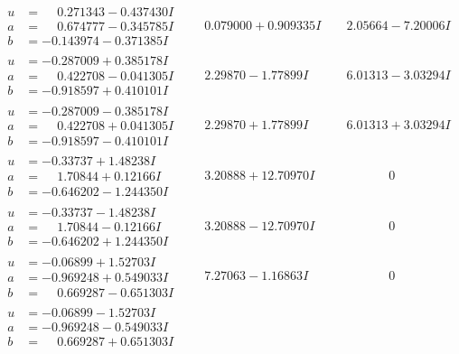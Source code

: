 \documentclass[1p]{elsarticle_modified}
\theoremstyle{definition}
\begin{document}
$$\begin{array}{c|c|c}
\begin{aligned}
u &= \phantom{-}0.271343 - 0.437430 I \\
a &= \phantom{-}0.674777 - 0.345785 I \\
b &= -0.143974 - 0.371385 I\end{aligned}
 & \phantom{-}0.079000 + 0.909335 I & \phantom{-}2.05664 - 7.20006 I \\ \hline\begin{aligned}
u &= -0.287009 + 0.385178 I \\
a &= \phantom{-}0.422708 - 0.041305 I \\
b &= -0.918597 + 0.410101 I\end{aligned}
 & \phantom{-}2.29870 - 1.77899 I & \phantom{-}6.01313 - 3.03294 I \\ \hline\begin{aligned}
u &= -0.287009 - 0.385178 I \\
a &= \phantom{-}0.422708 + 0.041305 I \\
b &= -0.918597 - 0.410101 I\end{aligned}
 & \phantom{-}2.29870 + 1.77899 I & \phantom{-}6.01313 + 3.03294 I \\ \hline\begin{aligned}
u &= -0.33737 + 1.48238 I \\
a &= \phantom{-}1.70844 + 0.12166 I \\
b &= -0.646202 - 1.244350 I\end{aligned}
 & \phantom{-}3.20888 + 12.70970 I & \phantom{-0.000000 } 0 \\ \hline\begin{aligned}
u &= -0.33737 - 1.48238 I \\
a &= \phantom{-}1.70844 - 0.12166 I \\
b &= -0.646202 + 1.244350 I\end{aligned}
 & \phantom{-}3.20888 - 12.70970 I & \phantom{-0.000000 } 0 \\ \hline\begin{aligned}
u &= -0.06899 + 1.52703 I \\
a &= -0.969248 + 0.549033 I \\
b &= \phantom{-}0.669287 - 0.651303 I\end{aligned}
 & \phantom{-}7.27063 - 1.16863 I & \phantom{-0.000000 } 0 \\ \hline\begin{aligned}
u &= -0.06899 - 1.52703 I \\
a &= -0.969248 - 0.549033 I \\
b &= \phantom{-}0.669287 + 0.651303 I\end{aligned}

\end{array}$$
\end{document}
